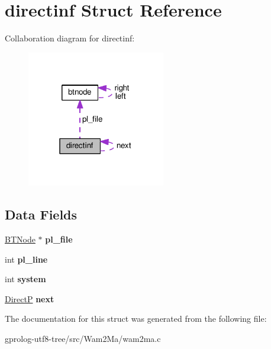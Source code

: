 \hypertarget{structdirectinf}{}\section{directinf Struct Reference}
\label{structdirectinf}


Collaboration diagram for directinf\+:\nopagebreak
\begin{figure}[H]
\begin{center}
\leavevmode
\includegraphics[width=171pt]{structdirectinf__coll__graph}
\end{center}
\end{figure}
\subsection*{Data Fields}
\begin{DoxyCompactItemize}
\item 
\hyperlink{structbtnode}{B\+T\+Node} $\ast$ {\bfseries pl\+\_\+file}\hypertarget{structdirectinf_a2d00b2ef3ca0317b568b16ed20968e52}{}\label{structdirectinf_a2d00b2ef3ca0317b568b16ed20968e52}

\item 
int {\bfseries pl\+\_\+line}\hypertarget{structdirectinf_ae817c137ec2f80b2a6409ae0ca8faa7a}{}\label{structdirectinf_ae817c137ec2f80b2a6409ae0ca8faa7a}

\item 
int {\bfseries system}\hypertarget{structdirectinf_a328d981a0d78b287ff7494df8d501635}{}\label{structdirectinf_a328d981a0d78b287ff7494df8d501635}

\item 
\hyperlink{structdirectinf}{DirectP} {\bfseries next}\hypertarget{structdirectinf_a6376c34c77718e3ea148063383fd29da}{}\label{structdirectinf_a6376c34c77718e3ea148063383fd29da}

\end{DoxyCompactItemize}


The documentation for this struct was generated from the following file\+:\begin{DoxyCompactItemize}
\item 
gprolog-\/utf8-\/tree/src/\+Wam2\+Ma/wam2ma.\+c\end{DoxyCompactItemize}
